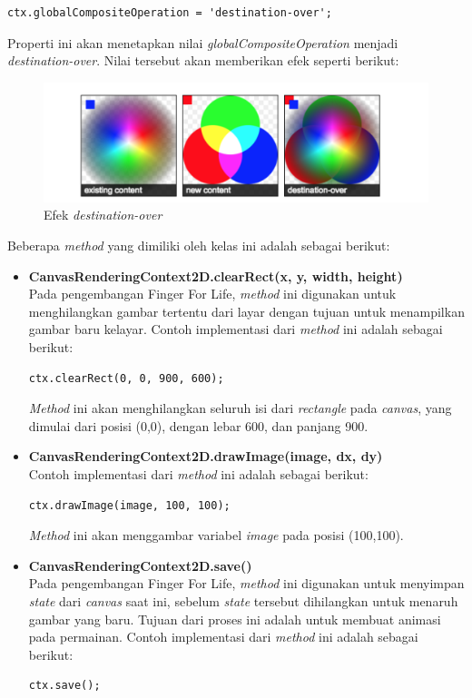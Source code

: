 \begin{enumerate}
\begin{enumerate}
\begin{itemize}
\begin{itemize}
\begin{lstlisting}
ctx.globalCompositeOperation = 'destination-over';
\end{lstlisting}
Properti ini akan menetapkan nilai \textit{globalCompositeOperation} menjadi \textit{destination-over}. Nilai tersebut akan memberikan efek seperti berikut:

\begin{figure}[H]
	\centering
	\includegraphics[scale=0.45]{Gambar/canvas_destination}
	\caption{Efek \textit{destination-over}}
	\label{fig:canvas_destination}
\end{figure}
			\end{itemize}
		\end{itemize}
		
		Beberapa \textit{method} yang dimiliki oleh kelas ini adalah sebagai berikut:
		\begin{itemize}
			\item \textbf{CanvasRenderingContext2D.clearRect(x, y, width, height)} \\
			Pada pengembangan Finger For Life, \textit{method} ini digunakan untuk menghilangkan gambar tertentu dari layar dengan tujuan untuk menampilkan gambar baru kelayar. Contoh implementasi dari \textit{method} ini adalah sebagai berikut:
\begin{lstlisting}
ctx.clearRect(0, 0, 900, 600);
\end{lstlisting}
\textit{Method} ini akan menghilangkan seluruh isi dari \textit{rectangle} pada \textit{canvas}, yang dimulai dari posisi (0,0), dengan lebar 600, dan panjang 900.			
			
			\item \textbf{CanvasRenderingContext2D.drawImage(image, dx, dy)} \\
			Contoh implementasi dari \textit{method} ini adalah sebagai berikut:
\begin{lstlisting}
ctx.drawImage(image, 100, 100);
\end{lstlisting}
\textit{Method} ini akan menggambar variabel \textit{image} pada posisi (100,100).

			\item \textbf{CanvasRenderingContext2D.save()} \\
			Pada pengembangan Finger For Life, \textit{method} ini digunakan untuk menyimpan \textit{state} dari \textit{canvas} saat ini, sebelum \textit{state} tersebut dihilangkan untuk menaruh gambar yang baru. Tujuan dari proses ini adalah untuk membuat animasi pada permainan. Contoh implementasi dari \textit{method} ini adalah sebagai berikut:
\begin{lstlisting}
ctx.save();
\end{lstlisting}	


\end{itemize}
\end{enumerate}
\end{enumerate}
